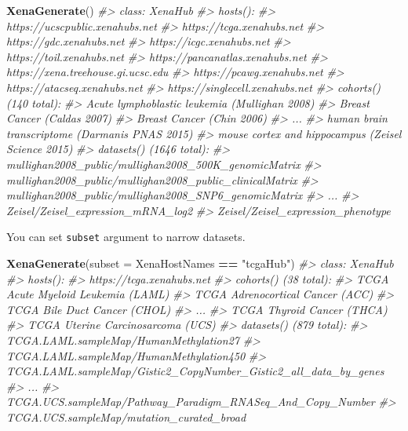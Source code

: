 \documentclass[nofonts,]{tufte-handout}
\newenvironment{Shaded}{\begin{snugshade}}{\end{snugshade}}
\newcommand{\CommentTok}[1]{\textcolor[rgb]{0.56,0.35,0.01}{\textit{#1}}}
\newcommand{\DataTypeTok}[1]{\textcolor[rgb]{0.13,0.29,0.53}{#1}}
\newcommand{\KeywordTok}[1]{\textcolor[rgb]{0.13,0.29,0.53}{\textbf{#1}}}
\newcommand{\NormalTok}[1]{#1}
\newcommand{\OperatorTok}[1]{\textcolor[rgb]{0.81,0.36,0.00}{\textbf{#1}}}
\newcommand{\StringTok}[1]{\textcolor[rgb]{0.31,0.60,0.02}{#1}}
\begin{document}
\begin{Shaded}
\begin{Highlighting}[]
\KeywordTok{XenaGenerate}\NormalTok{()}
\CommentTok{#> class: XenaHub }
\CommentTok{#> hosts():}
\CommentTok{#>   https://ucscpublic.xenahubs.net}
\CommentTok{#>   https://tcga.xenahubs.net}
\CommentTok{#>   https://gdc.xenahubs.net}
\CommentTok{#>   https://icgc.xenahubs.net}
\CommentTok{#>   https://toil.xenahubs.net}
\CommentTok{#>   https://pancanatlas.xenahubs.net}
\CommentTok{#>   https://xena.treehouse.gi.ucsc.edu}
\CommentTok{#>   https://pcawg.xenahubs.net}
\CommentTok{#>   https://atacseq.xenahubs.net}
\CommentTok{#>   https://singlecell.xenahubs.net}
\CommentTok{#> cohorts() (140 total):}
\CommentTok{#>   Acute lymphoblastic leukemia (Mullighan 2008)}
\CommentTok{#>   Breast Cancer (Caldas 2007)}
\CommentTok{#>   Breast Cancer (Chin 2006)}
\CommentTok{#>   ...}
\CommentTok{#>   human brain transcriptome (Darmanis PNAS 2015)}
\CommentTok{#>   mouse cortex and hippocampus (Zeisel Science 2015)}
\CommentTok{#> datasets() (1646 total):}
\CommentTok{#>   mullighan2008_public/mullighan2008_500K_genomicMatrix}
\CommentTok{#>   mullighan2008_public/mullighan2008_public_clinicalMatrix}
\CommentTok{#>   mullighan2008_public/mullighan2008_SNP6_genomicMatrix}
\CommentTok{#>   ...}
\CommentTok{#>   Zeisel/Zeisel_expression_mRNA_log2}
\CommentTok{#>   Zeisel/Zeisel_expression_phenotype}
\end{Highlighting}
\end{Shaded}

You can set \texttt{subset} argument to narrow datasets.

\begin{Shaded}
\begin{Highlighting}[]
\KeywordTok{XenaGenerate}\NormalTok{(}\DataTypeTok{subset =}\NormalTok{ XenaHostNames }\OperatorTok{==}\StringTok{ "tcgaHub"}\NormalTok{)}
\CommentTok{#> class: XenaHub }
\CommentTok{#> hosts():}
\CommentTok{#>   https://tcga.xenahubs.net}
\CommentTok{#> cohorts() (38 total):}
\CommentTok{#>   TCGA Acute Myeloid Leukemia (LAML)}
\CommentTok{#>   TCGA Adrenocortical Cancer (ACC)}
\CommentTok{#>   TCGA Bile Duct Cancer (CHOL)}
\CommentTok{#>   ...}
\CommentTok{#>   TCGA Thyroid Cancer (THCA)}
\CommentTok{#>   TCGA Uterine Carcinosarcoma (UCS)}
\CommentTok{#> datasets() (879 total):}
\CommentTok{#>   TCGA.LAML.sampleMap/HumanMethylation27}
\CommentTok{#>   TCGA.LAML.sampleMap/HumanMethylation450}
\CommentTok{#>   TCGA.LAML.sampleMap/Gistic2_CopyNumber_Gistic2_all_data_by_genes}
\CommentTok{#>   ...}
\CommentTok{#>   TCGA.UCS.sampleMap/Pathway_Paradigm_RNASeq_And_Copy_Number}
\CommentTok{#>   TCGA.UCS.sampleMap/mutation_curated_broad}
\end{Highlighting}
\end{Shaded}
\end{document}
